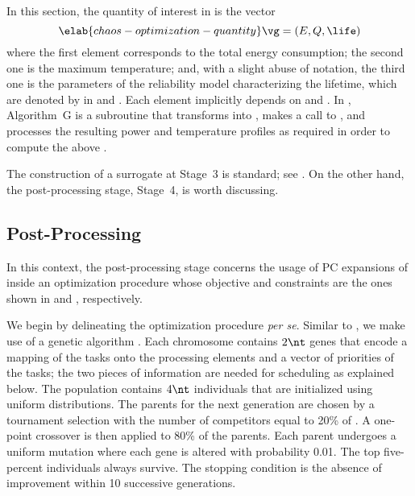 In this section, the quantity of interest \g in  is the
vector
\begin{equation} \elab{chaos-optimization-quantity}
  \vg = (E, Q, \life)
\end{equation}
where the first element corresponds to the total energy consumption; the second
one is the maximum temperature; and, with a slight abuse of notation, the third
one is the parameters of the reliability model characterizing the lifetime,
which are denoted by \vg in  and
. Each element implicitly depends on \schedule
and \vu. In , Algorithm~G is a subroutine that
transforms \vz into \vu, makes a call to
, and processes the resulting
power and temperature profiles as required in order to compute the above \vg.

The construction of a surrogate at Stage~3 is standard; see
. On the other hand, the post-processing stage,
Stage~4, is worth discussing.

\subsection{Post-Processing}

In this context, the post-processing stage concerns the usage of \ac{PC}
expansions of  inside an optimization
procedure whose objective and constraints are the ones shown in
 and ,
respectively.

We begin by delineating the optimization procedure \emph{per se}. Similar to
, we make use of a genetic algorithm
\cite{schmitz2004}. Each chromosome contains $2 \nt$ genes that encode a mapping
of the tasks onto the processing elements and a vector of priorities of the
tasks; the two pieces of information are needed for scheduling as explained
below. The population contains $4 \nt$ individuals that are initialized using
uniform distributions. The parents for the next generation are chosen by a
tournament selection with the number of competitors equal to 20\% of \nt. A
one-point crossover is then applied to 80\% of the parents. Each parent
undergoes a uniform mutation where each gene is altered with probability 0.01.
The top five-percent individuals always survive. The stopping condition is the
absence of improvement within 10 successive generations.

